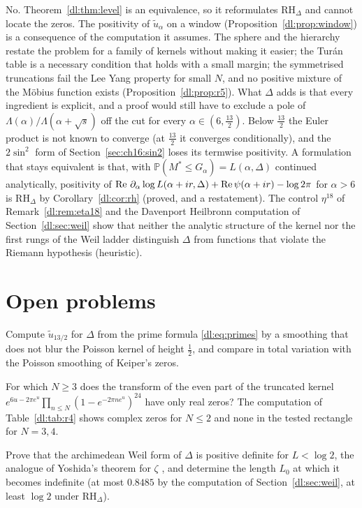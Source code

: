 No. Theorem~\ref{dl:thm:level} is an equivalence, so it reformulates $\mathrm{RH}_\Delta$ and cannot locate the zeros. The positivity of $\tilde u_\alpha$ on a window (Proposition~\ref{dl:prop:window}) is a consequence of the computation it assumes. The sphere and the hierarchy restate the problem for a family of kernels without making it easier; the Tur\'an table is a necessary condition that holds with a small margin; the symmetrised truncations fail the Lee Yang property for small $N$, and no positive mixture of the M\"obius function exists (Proposition~\ref{dl:prop:r5}). What $\Delta$ adds is that every ingredient is explicit, and a proof would still have to exclude a pole of $\Lambda(\alpha)/\Lambda(\alpha+\sqrt s)$ off the cut for every $\alpha\in(6,\frac{13}2)$. Below $\frac{13}2$ the Euler product is not known to converge (at $\frac{13}2$ it converges conditionally), and the $2\sin^2$ form of Section~\ref{sec:ch16:sin2} loses its termwise positivity. A formulation that stays equivalent is that, with $\mathbb P(M^*\le G_\alpha)=L(\alpha,\Delta)$ continued analytically, positivity of $\operatorname{Re}\,\partial_\alpha\log L(\alpha+ir,\Delta)+\operatorname{Re}\psi(\alpha+ir)-\log2\pi$ for $\alpha>6$ is $\mathrm{RH}_\Delta$ by Corollary~\ref{dl:cor:rh} (proved, and a restatement). The control $\eta^{18}$ of Remark~\ref{dl:rem:eta18} and the Davenport Heilbronn computation of Section~\ref{dl:sec:weil} show that neither the analytic structure of the kernel nor the first rungs of the Weil ladder distinguish $\Delta$ from functions that violate the Riemann hypothesis (heuristic).

\section{Open problems}\label{dl:sec:open}

\begin{problem}\label{dl:prob:primes}
Compute $\tilde u_{13/2}$ for $\Delta$ from the prime formula \eqref{dl:eq:primes} by a smoothing that does not blur the Poisson kernel of height $\frac12$, and compare in total variation with the Poisson smoothing of Keiper's zeros.
\end{problem}

\begin{problem}\label{dl:prob:lee}
For which $N\ge3$ does the transform of the even part of the truncated kernel $e^{6u-2\pi e^u}\prod_{n\le N}(1-e^{-2\pi ne^u})^{24}$ have only real zeros? The computation of Table~\ref{dl:tab:r4} shows complex zeros for $N\le2$ and none in the tested rectangle for $N=3,4$.
\end{problem}

\begin{problem}\label{dl:prob:yoshida}
Prove that the archimedean Weil form of $\Delta$ is positive definite for $L<\log2$, the analogue of Yoshida's theorem for $\zeta$ \cite{Yoshida92}, and determine the length $L_0$ at which it becomes indefinite (at most $0.8485$ by the computation of Section~\ref{dl:sec:weil}, at least $\log2$ under $\mathrm{RH}_\Delta$).
\end{problem}

